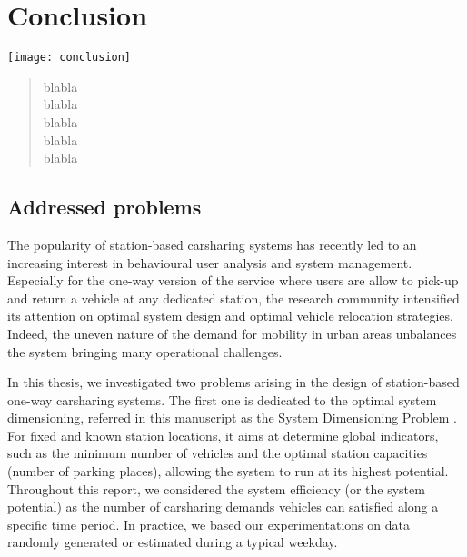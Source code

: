 \chapter{Conclusion} \label{chap:conclusion}
\minitoc
\vspace{2cm}

\begin{minipage}[c]{0.45\linewidth}
\texttt{[image: conclusion]}
\end{minipage}
\hfill
\begin{minipage}[c]{0.45\linewidth}
\begin{abstract}
blabla\\
blabla\\
blabla\\
blabla\\
blabla\\
\end{abstract}
\end{minipage}



\newpage
\section{Addressed problems}
The popularity of station-based carsharing systems has recently led to an increasing interest in behavioural user analysis and system management.
Especially for the one-way version of the service where users are allow to pick-up and return a vehicle at any dedicated station, the research community intensified its attention on optimal system design and optimal vehicle relocation strategies.
Indeed, the uneven nature of the demand for mobility in urban areas unbalances the system bringing many operational challenges.


\medskip
In this thesis, we investigated two problems arising in the design of station-based one-way carsharing systems.
The first one is dedicated to the optimal system dimensioning, referred in this manuscript as the System Dimensioning Problem {\SDP}.
For fixed and known station locations, it aims at determine global indicators, such as the minimum number of vehicles and the optimal station capacities (number of parking places), allowing the system to run at its highest potential.
Throughout this report, we considered the system efficiency (or the system potential) as the number of carsharing demands vehicles can satisfied along a specific time period.
In practice, we based our experimentations on data randomly generated or estimated during a typical weekday.%

